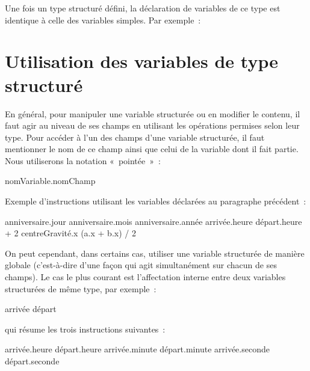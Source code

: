 		Une fois un type structuré défini, 
		la déclaration de variables de ce type 
		est identique à celle des variables simples. 
		Par exemple~:
	
		\begin{LDA}
		\end{LDA}
	
	\section{Utilisation des variables de type structuré}
	
		En général, 
		pour manipuler une variable structurée ou en modifier le contenu, 
		il faut agir au niveau de ses champs en utilisant 
		les opérations permises selon leur type. 
		Pour accéder à l’un des champs d’une variable structurée, 
		il faut mentionner le nom de ce champ 
		ainsi que celui de la variable dont il fait partie.
		Nous utiliserons la notation «~pointée~»~:
	
		\begin{LDA}
		\Stmt nomVariable.nomChamp
		\end{LDA}
	
		Exemple d’instructions utilisant les variables
		déclarées au paragraphe précédent~:
	
		\begin{LDA}
		\Let anniversaire.jour \Gets 15
		\Let anniversaire.mois \Gets 10
		\Let anniversaire.année \Gets 2014
		\Let arrivée.heure \Gets départ.heure + 2
		\Let centreGravité.x \Gets (a.x + b.x) / 2
		\end{LDA}
	
		On peut cependant, dans certains cas, 
		utiliser une variable structurée de manière globale 
		(c’est-à-dire d’une façon qui agit simultanément sur chacun de ses champs). 
		Le cas le plus courant est l’affectation interne 
		entre deux variables structurées de même type, 
		par exemple~:
	
		\begin{LDA}
		\Let arrivée \Gets départ
		\end{LDA}
	
		qui résume les trois instructions suivantes~:
	
		\begin{LDA}
		\Let arrivée.heure \Gets départ.heure
		\Let arrivée.minute \Gets départ.minute
		\Let arrivée.seconde \Gets départ.seconde
		\end{LDA}
	
